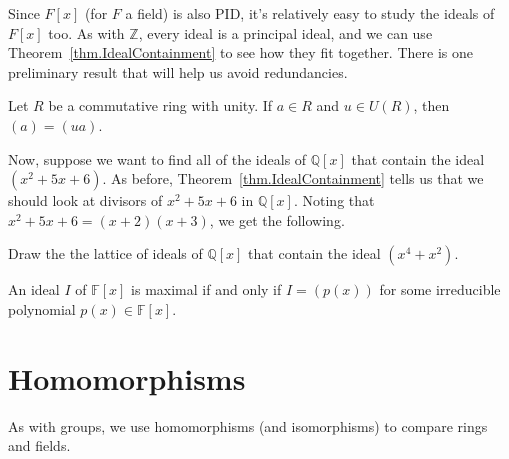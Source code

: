 Since $F[x]$ (for $F$ a field) is also PID, it's relatively easy to study the ideals of $F[x]$ too. As with $\mathbb{Z}$, every ideal is a principal ideal, and we can use Theorem~\ref{thm.IdealContainment} to see how they fit together. There is one preliminary result that will help us avoid redundancies.

\begin{theorem}\label{thm.DifferByUnitSameIdeal}
Let $R$ be a commutative ring with unity. If $a \in R$ and $u\in U(R)$, then $(a) = (ua)$.
\end{theorem}

Now, suppose we want to find all of the ideals of $\mathbb{Q}[x]$ that contain the ideal $(x^2+5x+6)$. As before, Theorem~\ref{thm.IdealContainment} tells us that we should look at divisors of $x^2+5x+6$ in $\mathbb{Q}[x]$. Noting that $x^2+5x+6 =  (x+2)(x+3)$, we get the following. 
\begin{center}
\end{center}


\begin{problem}
Draw the the lattice of ideals of $\mathbb{Q}[x]$ that contain the ideal $(x^4 +x^2)$.
\end{problem}

\begin{theorem}
An ideal $I$ of $\mathbb{F}[x]$ is maximal if and only if $I=(p(x))$ for some irreducible polynomial $p(x)\in \mathbb{F}[x]$.
\end{theorem}



\section{Homomorphisms}
As with groups, we use homomorphisms (and isomorphisms) to compare rings and fields.

